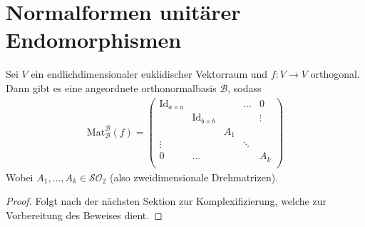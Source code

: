 \documentclass{report}
\newcommand{\cB}{\mathcal{B}}
\newcommand{\Mat}[3]{\text{Mat}^{#1}_{#2}\left(#3\right)}
\newcommand{\Id}{\text{Id}}
\newcommand{\SO}{\mathcal{SO}}
\begin{document}
\section{Normalformen unitärer Endomorphismen}
\begin{theorem}
 Sei $V$ ein endlichdimensionaler euklidischer Vektorraum und $f : V \to V$ orthogonal. Dann gibt es eine angeordnete orthonormalbasis $\cB$, sodass
 \begin{align*}
  \Mat{\cB}{\cB}{f} = \begin{pmatrix}
                       \Id_{a \times a} &  &  & \hdots & 0\\
                        & \Id_{b \times b} &  & & \vdots\\
                        &  & A_1 &  & \\
                       \vdots &  &  & \ddots & \\
                       0 & \hdots &   &  & A_k\\
                      \end{pmatrix}
 \end{align*}
 Wobei $A_1, \hdots, A_k \in \SO_2$ (also zweidimensionale Drehmatrizen).
\end{theorem}
\begin{proof}
 Folgt nach der nächsten Sektion zur Komplexifizierung, welche zur Vorbereitung des Beweises dient.
\end{proof}
\end{document}
